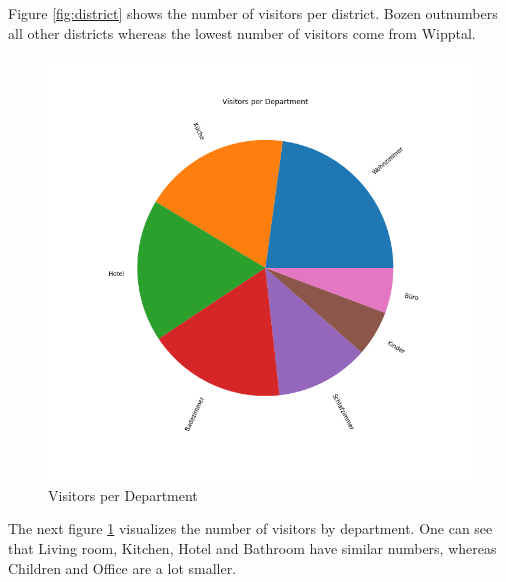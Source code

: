 \documentclass[letterpaper,12pt]{article}
\begin{document}
Figure \ref{fig:district} shows the number of visitors per district. Bozen outnumbers all other districts whereas the lowest number of visitors come from Wipptal.

\begin{figure}[H] 
        \centering
        \includegraphics[width=\columnwidth]{../images/department.png}
        \caption{
                \label{fig:department}  
                Visitors per Department
        }
\end{figure}

The next figure \ref{fig:department} visualizes the number of visitors by department. One can see that Living room, Kitchen, Hotel and Bathroom have similar numbers, whereas Children and Office are a lot smaller.
\end{document}
